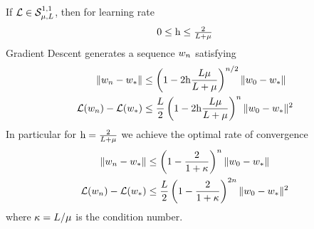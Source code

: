 \begin{theorem}
	\label{thm: gd strong convexity convergence rate}
	If \(\mathcal{L}\in\mathcal{S}^{1,1}_{{\mu},{L}}\), then for learning rate
	\[0 \le \text{h} \le \tfrac{2}{L+\mu}\]
	Gradient Descent generates a sequence \(w_n\) satisfying
	\begin{subequations}
	\begin{align}
		\label{eq: gd strong convexity convergence rate 1}
		\|w_n - w_*\|
		&\le \left(
			1- 2\text{h}\frac{L\mu}{L+\mu}
		\right)^{n/2}
		\|w_0 - w_*\| \\
		\label{eq: gd strong convexity convergence rate 2}
		\mathcal{L}(w_n) - \mathcal{L}(w_*)
		&\le \frac{L}{2} \left(
			1- 2\text{h}\frac{L\mu}{L+\mu}
		\right)^{n}
		\|w_0 - w_*\|^2
	\end{align}
	\end{subequations}
	In particular for \(\text{h}=\tfrac2{L+\mu}\) we achieve the optimal
	rate of convergence
	\begin{subequations}\label{eq: gd strong convexity optimal rate}
	\begin{align}
		\|w_n - w_*\|
		&\le \left(
			1- \frac{2}{1+\kappa}
		\right)^n
		\|w_0 - w_*\| \\
		\mathcal{L}(w_n) - \mathcal{L}(w_*)
		&\le \frac{L}{2} \left(
			1- \frac{2}{1+\kappa}
		\right)^{2n}
		\|w_0 - w_*\|^2
	\end{align}
	\end{subequations}
	where \(\kappa=L/\mu\) is the condition number.
\end{theorem}
